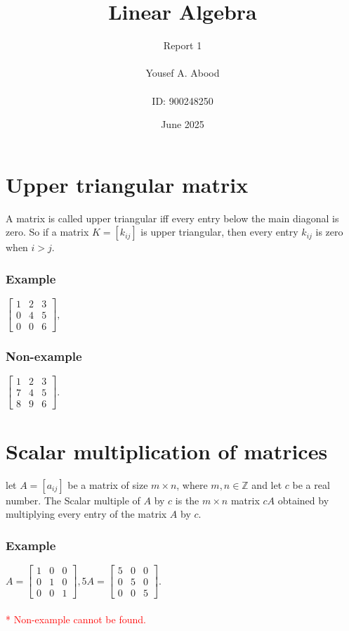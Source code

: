 \documentclass[a4paper,12pt]{article}
\title{Linear Algebra}
\author{Report 1\\ \\ Yousef A. Abood\\ \\ ID: 900248250}
\date{June 2025}
\begin{document}
\maketitle
\noindent\makebox[\linewidth]{\rule{15cm}{0.4pt}}
\section{Upper triangular matrix}
A matrix is called upper triangular iff every entry below the main diagonal is zero. So if a matrix $K=[k_{ij}]$ is upper triangular, then every entry $k_{ij}$ is zero when $i>j$.
\begin{multicols}{2}
\subsubsection*{Example}
$\begin{bmatrix}
  1 & 2 & 3 \\
  0 & 4 & 5 \\
  0 & 0 & 6
\end{bmatrix},$

\subsubsection*{Non-example}
$\begin{bmatrix}
  1 & 2 & 3 \\
  7 & 4 & 5 \\
  8 & 9 & 6
\end{bmatrix}.$
\end{multicols}
\section{Scalar multiplication of matrices
}
let $A=[a_{ij}]$ be a matrix of size $m\times n$, where $m,n \in \mathbb{Z}$ and let $c$ be a real number. The Scalar multiple of $A$ by $c$ is the $m \times n$ matrix $cA$ obtained by multiplying every entry of the matrix $A$ by $c$.
\subsubsection*{Example}
$ A=\begin{bmatrix}
  1 & 0 & 0 \\
  0 & 1 & 0 \\
  0 & 0 & 1
\end{bmatrix},
5A= \begin{bmatrix}
  5 & 0 & 0 \\
  0 & 5 & 0 \\
  0 & 0 & 5
\end{bmatrix}.$\\ \\
\textcolor{red}{* Non-example cannot be found.}
\end{document}
